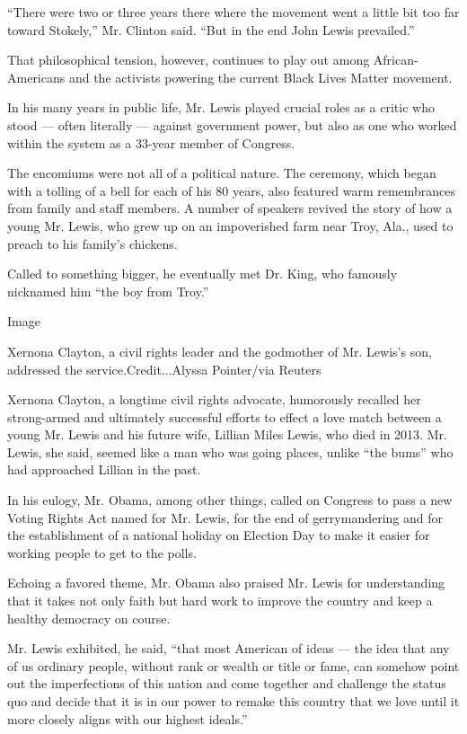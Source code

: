 ``There were two or three years there where the movement went a little
bit too far toward Stokely,'' Mr. Clinton said. ``But in the end John
Lewis prevailed.''

That philosophical tension, however, continues to play out among
African-Americans and the activists powering the current Black Lives
Matter movement.

In his many years in public life, Mr. Lewis played crucial roles as a
critic who stood --- often literally --- against government power, but
also as one who worked within the system as a 33-year member of
Congress.

The encomiums were not all of a political nature. The ceremony, which
began with a tolling of a bell for each of his 80 years, also featured
warm remembrances from family and staff members. A number of speakers
revived the story of how a young Mr. Lewis, who grew up on an
impoverished farm near Troy, Ala., used to preach to his family's
chickens.

Called to something bigger, he eventually met Dr. King, who famously
nicknamed him ``the boy from Troy.''

Image

Xernona Clayton, a civil rights leader and the godmother of Mr. Lewis's
son, addressed the service.Credit...Alyssa Pointer/via Reuters

Xernona Clayton, a longtime civil rights advocate, humorously recalled
her strong-armed and ultimately successful efforts to effect a love
match between a young Mr. Lewis and his future wife, Lillian Miles
Lewis, who died in 2013. Mr. Lewis, she said, seemed like a man who was
going places, unlike ``the bums'' who had approached Lillian in the
past.

In his eulogy, Mr. Obama, among other things, called on Congress to pass
a new Voting Rights Act named for Mr. Lewis, for the end of
gerrymandering and for the establishment of a national holiday on
Election Day to make it easier for working people to get to the polls.

Echoing a favored theme, Mr. Obama also praised Mr. Lewis for
understanding that it takes not only faith but hard work to improve the
country and keep a healthy democracy on course.

Mr. Lewis exhibited, he said, ``that most American of ideas --- the idea
that any of us ordinary people, without rank or wealth or title or fame,
can somehow point out the imperfections of this nation and come together
and challenge the status quo and decide that it is in our power to
remake this country that we love until it more closely aligns with our
highest ideals.''

